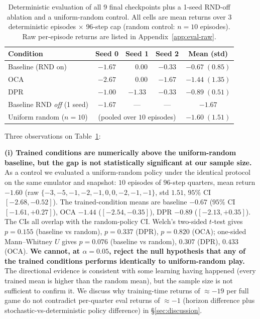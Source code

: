 \documentclass{article}
\begin{document}
\begin{table}[h]
  \caption{Deterministic evaluation of all 9 final checkpoints plus
  a 1-seed RND-off ablation and a uniform-random control. All cells
  are mean returns over $3$ deterministic episodes $\times$
  $96$-step cap (random control: $n{=}10$ episodes). Raw
  per-episode returns are listed in
  Appendix~\ref{app:eval-raw}.}
  \label{tab:eval}
  \centering
  \small
  \begin{tabular}{lcccc}
    \toprule
    \textbf{Condition} & \textbf{Seed 0} & \textbf{Seed 1} & \textbf{Seed 2} & \textbf{Mean (std)} \\
    \midrule
    Baseline (RND on) & $-1.67$ & $\phantom{-}0.00$ & $-0.33$ & $-0.67\;(0.85)$ \\
    OCA               & $-2.67$ & $\phantom{-}0.00$ & $-1.67$ & $-1.44\;(1.35)$ \\
    DPR               & $-1.00$ & $-1.33$           & $-0.33$ & $-0.89\;(0.51)$ \\
    \midrule
    Baseline RND \emph{off} (1 seed) & $-1.67$ & --- & --- & $-1.67$ \\
    Uniform random ($n{=}10$)         & \multicolumn{3}{c}{(pooled over $10$ episodes)} & $-1.60\;(1.51)$ \\
    \bottomrule
  \end{tabular}
\end{table}

Three observations on Table~\ref{tab:eval}:

\textbf{(i) Trained conditions are numerically above the uniform-random
baseline, but the gap is not statistically significant at our
sample size.} As a control we evaluated a uniform-random policy
under the identical protocol on the same emulator and snapshot:
$10$ episodes of $96$-step quarters, mean return $-1.60$
(raw $\{-3,-5,-1,-2,-1,0,0,-2,-1,-1\}$, std $1.51$, $95\%$ CI
$[-2.68, -0.52]$). The trained-condition means are
baseline $-0.67$ ($95\%$ CI $[-1.61,+0.27]$),
OCA $-1.44$ ($[-2.54,-0.35]$), DPR $-0.89$ ($[-2.13,+0.35]$).
The CIs all overlap with the random-policy CI. Welch's two-sided
$t$-test gives $p = 0.155$ (baseline vs random),
$p = 0.337$ (DPR), $p = 0.820$ (OCA); one-sided Mann--Whitney $U$
gives $p = 0.076$ (baseline vs random), $0.307$ (DPR), $0.433$
(OCA). \textbf{We cannot, at $\alpha = 0.05$, reject the null
hypothesis that any of the trained conditions performs identically
to uniform-random play.} The directional evidence is consistent
with some learning having happened (every trained mean is higher
than the random mean), but the sample size is not sufficient to
confirm it. We discuss why training-time returns of $\approx-19$
per full game do not contradict per-quarter eval returns of
$\approx-1$ (horizon difference plus stochastic-vs-deterministic
policy difference) in \S\ref{sec:discussion}.
\end{document}
